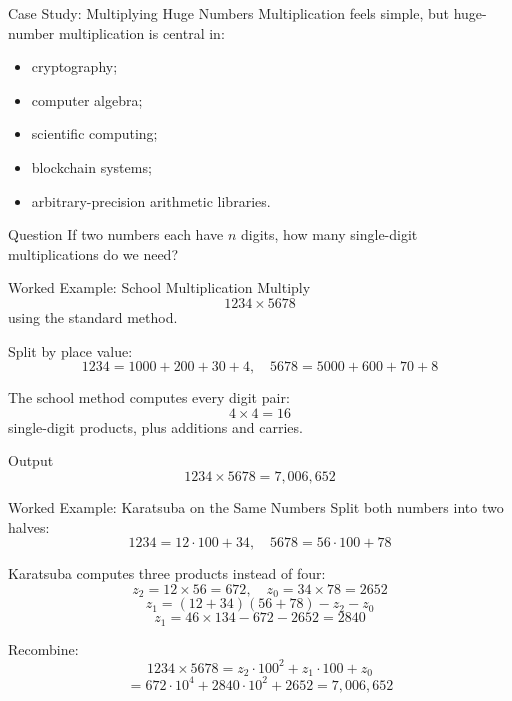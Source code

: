 \documentclass[aspectratio=169,xcolor=dvipsnames]{beamer}
\begin{document}
\begin{frame}{Case Study: Multiplying Huge Numbers}
  Multiplication feels simple, but huge-number multiplication is central in:
  \begin{itemize}
    \item cryptography;
    \item computer algebra;
    \item scientific computing;
    \item blockchain systems;
    \item arbitrary-precision arithmetic libraries.
  \end{itemize}
  \vspace{0.5em}
  \begin{alertblock}{Question}
    If two numbers each have $n$ digits, how many single-digit multiplications do we need?
  \end{alertblock}
\end{frame}

\begin{frame}{Worked Example: School Multiplication}
  Multiply
  \[
    1234 \times 5678
  \]
  using the standard method.

  \vspace{0.4em}
  Split by place value:
  \[
    1234 = 1000 + 200 + 30 + 4,\quad
    5678 = 5000 + 600 + 70 + 8
  \]

  \vspace{0.4em}
  The school method computes every digit pair:
  \[
    4 \times 4 = 16
  \]
  single-digit products, plus additions and carries.

  \vspace{0.4em}
  \begin{block}{Output}
    \[
      1234 \times 5678 = 7,006,652
    \]
  \end{block}
\end{frame}

\begin{frame}{Worked Example: Karatsuba on the Same Numbers}
  Split both numbers into two halves:
  \[
    1234 = 12 \cdot 100 + 34,\quad 5678 = 56 \cdot 100 + 78
  \]

  Karatsuba computes three products instead of four:
  \[
    z_2 = 12 \times 56 = 672,\quad
    z_0 = 34 \times 78 = 2652
  \]
  \[
    z_1 = (12 + 34)(56 + 78) - z_2 - z_0
  \]
  \[
    z_1 = 46 \times 134 - 672 - 2652 = 2840
  \]

  Recombine:
  \[
    1234 \times 5678 = z_2 \cdot 100^2 + z_1 \cdot 100 + z_0
  \]
  \[
    = 672 \cdot 10^4 + 2840 \cdot 10^2 + 2652 = 7,006,652
  \]
\end{frame}
\end{document}
